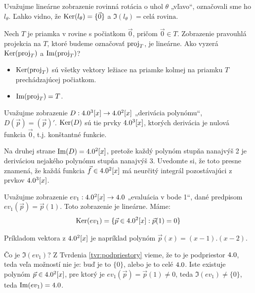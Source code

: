 \begin{priklad} \label{ex:rotacia}
Uvažujme lineárne zobrazenie rovinná rotácia o uhol $\theta$ „vľavo“, označovali sme ho $l_{\theta}$.
Ľahko vidno, že $\operatorname{Ker}(l_{\theta}) = \{ \vec{0} \}$ a $\Im(l_{\theta}) = \text{celá rovina}$.
\end{priklad}

\begin{priklad} \label{ex:projekcia}
Nech $T$ je priamka v rovine s počiatkom $\vec{0}$, pričom $\vec{0} \in T$. Zobrazenie pravouhlá projekcia na $T$, ktoré budeme označovať $\operatorname{proj}_T$, je lineárne. Ako vyzerá $\operatorname{Ker}(\operatorname{proj}_T)$ a $\operatorname{Im}(\operatorname{proj}_T)$?

\begin{itemize}
    \item $\operatorname{Ker}(\operatorname{proj}_T)$ sú všetky vektory ležiace na priamke kolmej na priamku $T$ prechádzajúcej počiatkom.
    \item $\operatorname{Im}(\operatorname{proj}_T) = T$.
\end{itemize}
\end{priklad}

\begin{priklad} \label{ex:derivacia}
Uvažujme zobrazenie $D: 4.0^3[x] \to 4.0^2[x]$ „derivácia polynómu“, $D(\vec p) = (\vec p)'$. $\operatorname{Ker}(D)$ sú tie prvky
$4.0^3[x]$, ktorých derivácia je nulová funkcia $\vec 0$, t.j. konštantné funkcie. 

Na druhej strane $\operatorname{Im}(D) = 4.0^2[x]$, pretože každý
polynóm stupňa nanajvýš 2 je deriváciou nejakého polynómu stupňa nanajvýš 3. Uvedomte si, že toto presne znamená,
že každá funkcia $\vec f\in4.0^2[x]$ má neurčitý integrál pozostávajúci z prvkov $4.0^3[x]$.
\end{priklad}

\begin{priklad} \label{ex:evaluacia}
Uvažujme zobrazenie $ev_1: 4.0^2[x] \to 4.0$ „evaluácia v bode 1“, dané predpisom $ev_1(\vec p) = \vec p(1)$. Toto zobrazenie je lineárne. Máme:
\[ \operatorname{Ker}(ev_1) = \{\vec p \in 4.0^2[x] : \vec p(1) = 0 \} \]

Príkladom vektora z $4.0^2[x]$ je napríklad polynóm $\vec p(x)=(x-1).(x-2)$. 

\begin{center}
\end{center}

Čo je $\Im(ev_1)$? Z Tvrdenia \ref{tvr:podpriestory} vieme, že to je podpriestor $4.0$, teda veľa možností nie je: buď je
to $\{0\}$, alebo je to celé $4.0$. Iste existuje polynóm $\vec p \in 4.0^2[x]$, pre ktorý je $ev_1(\vec p) = \vec p(1)
\neq 0$, teda $\Im(ev_1) \neq \{0\}$, teda $\operatorname{Im}(ev_1) = 4.0$.
\end{priklad}

